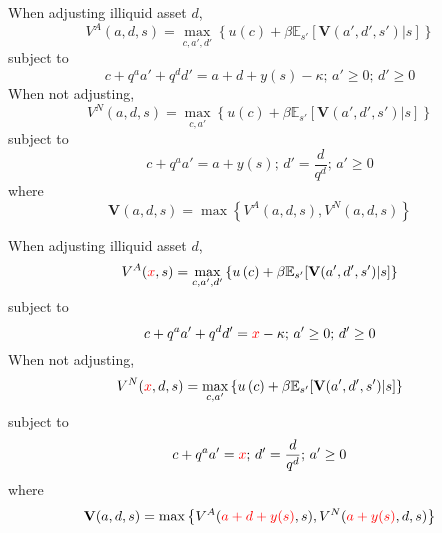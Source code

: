 \documentclass{beamer}
\begin{document}
\begin{frame}
  When adjusting illiquid asset $d$,
  \begin{equation*}
  V^A(a, d, s) = \max_{c, a', d'}\left\{u\left(c\right) + \beta \mathbb{E}_{s'}[\mathbf{V}(a', d', s')|s]\right\}
  \end{equation*}
  subject to
  \begin{equation*}
  c + q^aa' + q^dd' = a + d + y(s) - \kappa\text{; }a'\geq 0 \text{; }d' \geq 0
  \end{equation*}
  When not adjusting,
  \begin{equation*}
  V^N(a, d, s) = \max_{c, a'}\left\{u\left(c\right) + \beta \mathbb{E}_{s'}[\mathbf{V}(a', d', s')|s]\right\}
  \end{equation*}
  subject to
  \begin{equation*}
  c + q^aa' = a  + y(s)\text{; }d' = \frac{d}{q^d}\text{; }a'\geq 0
  \end{equation*}
  where
  \begin{equation*}
    \mathbf{V}(a, d, s) = \max\left\{V^A(a, d, s), V^N(a, d, s)\right\}
  \end{equation*}
\end{frame}

\begin{frame}
  When adjusting illiquid asset $d$,
  \begin{equation*}
  V^A(\textcolor{red}{x}, s) = \max_{c, a', d'}\left\{u\left(c\right) + \beta \mathbb{E}_{s'}[\mathbf{V}(a', d', s')|s]\right\}
  \end{equation*}
  subject to
  \begin{equation*}
  c + q^aa' + q^dd' = \textcolor{red}{x} - \kappa\text{; }a'\geq 0 \text{; }d' \geq 0
  \end{equation*}
  When not adjusting,
  \begin{equation*}
  V^N(\textcolor{red}{x}, d, s) = \max_{c, a'}\left\{u\left(c\right) + \beta \mathbb{E}_{s'}[\mathbf{V}(a', d', s')|s]\right\}
  \end{equation*}
  subject to
  \begin{equation*}
  c + q^aa' = \textcolor{red}{x}\text{; }d' = \frac{d}{q^d}\text{; }a'\geq 0
  \end{equation*}
  where
  \begin{equation*}
    \mathbf{V}(a, d, s) = \max\left\{V^A(\textcolor{red}{a+d+y(s)}, s), V^N(\textcolor{red}{a + y(s)}, d, s)\right\}
  \end{equation*}
\end{frame}
\end{document}

